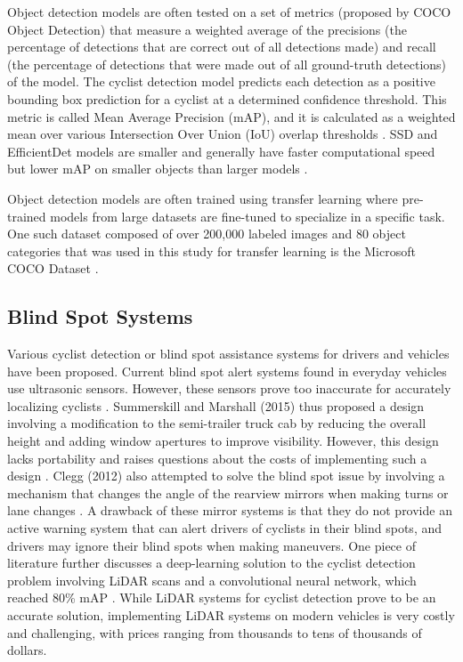 \documentclass{article}
\begin{document}
Object detection models are often tested on a set of metrics (proposed by COCO Object Detection) that measure a weighted average of the precisions (the percentage of detections that are correct out of all detections made) and recall (the percentage of detections that were made out of all ground-truth detections) of the model. The cyclist detection model predicts each detection as a positive bounding box prediction for a cyclist at a determined confidence threshold. This metric is called Mean Average Precision (mAP), and it is calculated as a weighted mean over various Intersection Over Union (IoU) overlap thresholds \cite{lin_microsoft_2015}. SSD and EfficientDet models are smaller and generally have faster computational speed but lower mAP on smaller objects than larger models \cite{huang_speedaccuracy_2017}. 

Object detection models are often trained using transfer learning where pre-trained models from large datasets are fine-tuned to specialize in a specific task. One such dataset composed of over 200,000 labeled images and 80 object categories that was used in this study for transfer learning is the Microsoft COCO Dataset \cite{lin_microsoft_2015}. 

\subsection{Blind Spot Systems}
Various cyclist detection or blind spot assistance systems for drivers and vehicles have been proposed. Current blind spot alert systems found in everyday vehicles use ultrasonic sensors. However, these sensors prove too inaccurate for accurately localizing cyclists \cite{zhang_design_2019} \cite{victor_blind_2013}. Summerskill and Marshall (2015) thus proposed a design involving a modification to the semi-trailer truck cab by reducing the overall height and adding window apertures to improve visibility. However, this design lacks portability and raises questions about the costs of implementing such a design \cite{summerskill_development_2015}. Clegg (2012) also attempted to solve the blind spot issue by involving a mechanism that changes the angle of the rearview mirrors when making turns or lane changes \cite{clegg_apparatus_2012}. A drawback of these mirror systems is that they do not provide an active warning system that can alert drivers of cyclists in their blind spots, and drivers may ignore their blind spots when making maneuvers. One piece of literature further discusses a deep-learning solution to the cyclist detection problem involving LiDAR scans and a convolutional neural network, which reached 80\% mAP \cite{saleh_cyclist_2017}. While LiDAR systems for cyclist detection prove to be an accurate solution, implementing LiDAR systems on modern vehicles is very costly and challenging, with prices ranging from thousands to tens of thousands of dollars.
\end{document}
